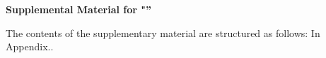 \documentclass[aps,%
twocolumn,%
floatfix,%
pra,%
amsfonts,%
longbibliography,%
groupedaddress,%
superscriptaddress]{revtex4-2}%
\newcommand{\1}{\mathbbm{1}}
\begin{document}
\makeatletter
\newcommand{\appendixtitle}[1]{\gdef\@title{#1}}
\newcommand{\appendixauthor}[1]{\gdef\@author{#1}}
\newcommand{\appendixaffiliation}[1]{\gdef\@affiliation{#1}}
\newcommand{\appendixdate}[1]{\gdef\@date{#1}}
\makeatother

\makeatletter%
\newcommand{\appendixmaketitle}{%
\begin{center}%
\vspace{0.4in}%
{\Large \@title \par}%
\end{center}%
\par%
}%
\makeatother%

\setcounter{secnumdepth}{2}
\appendix
\widetext
\newpage

\appendixtitle{\bf 
Supplemental Material for "''}
\appendixmaketitle
\vspace{0.2in}

The contents of the supplementary material are structured as follows: 
In Appendix..
\end{document}
